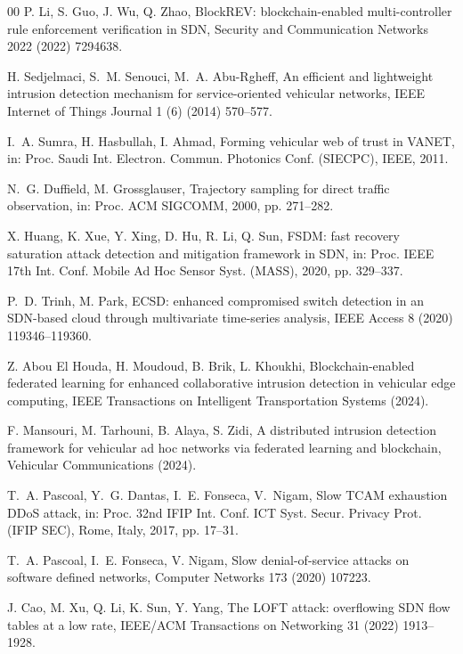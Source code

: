 \documentclass[final,5p,twocolumn]{elsarticle}
\theoremstyle{remark}
\theoremstyle{plain}
\begin{document}
\begin{thebibliography}{00}
	P. Li, S. Guo, J. Wu, Q. Zhao, BlockREV: blockchain-enabled multi-controller rule enforcement verification in SDN, Security and Communication Networks 2022 (2022) 7294638.

	H. Sedjelmaci, S.~M. Senouci, M.~A. Abu-Rgheff, An efficient and lightweight intrusion detection mechanism for service-oriented vehicular networks, IEEE Internet of Things Journal 1 (6) (2014) 570--577.

	I.~A. Sumra, H. Hasbullah, I. Ahmad, Forming vehicular web of trust in VANET, in: Proc. Saudi Int. Electron. Commun. Photonics Conf. (SIECPC), IEEE, 2011.

	N.~G. Duffield, M. Grossglauser, Trajectory sampling for direct traffic observation, in: Proc. ACM SIGCOMM, 2000, pp. 271--282.

	X. Huang, K. Xue, Y. Xing, D. Hu, R. Li, Q. Sun, FSDM: fast recovery saturation attack detection and mitigation framework in SDN, in: Proc. IEEE 17th Int. Conf. Mobile Ad Hoc Sensor Syst. (MASS), 2020, pp. 329--337.

	P.~D. Trinh, M. Park, ECSD: enhanced compromised switch detection in an SDN-based cloud through multivariate time-series analysis, IEEE Access 8 (2020) 119346--119360.

	Z. Abou El Houda, H. Moudoud, B. Brik, L. Khoukhi, Blockchain-enabled federated learning for enhanced collaborative intrusion detection in vehicular edge computing, IEEE Transactions on Intelligent Transportation Systems (2024).

	F. Mansouri, M. Tarhouni, B. Alaya, S. Zidi, A distributed intrusion detection framework for vehicular ad hoc networks via federated learning and blockchain, Vehicular Communications (2024).

	T.~A. Pascoal, Y.~G. Dantas, I.~E. Fonseca, V.~Nigam, Slow TCAM exhaustion DDoS attack, in: Proc. 32nd IFIP Int. Conf. ICT Syst. Secur. Privacy Prot. (IFIP SEC), Rome, Italy, 2017, pp. 17--31.

	T.~A. Pascoal, I.~E. Fonseca, V. Nigam, Slow denial-of-service attacks on software defined networks, Computer Networks 173 (2020) 107223.

	J. Cao, M. Xu, Q. Li, K. Sun, Y. Yang, The LOFT attack: overflowing SDN flow tables at a low rate, IEEE/ACM Transactions on Networking 31 (2022) 1913--1928.


\end{thebibliography}
\end{document}
